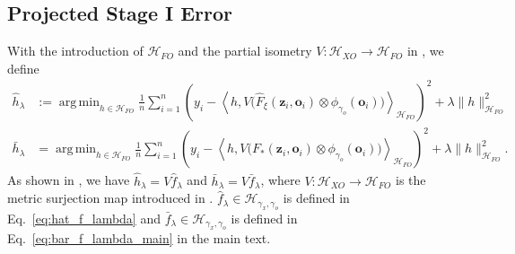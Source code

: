 \documentclass[11pt]{article}
\newcommand{\bz}{\mathbf z}
\newcommand{\bo}{\mathbf o}
\newcommand{\calH}{\mathcal{H}}
\newcommand{\0}{\mathbf{0}}
\DeclareMathOperator*{\argmin}{arg\,min}
\begin{document}
\begin{appendix}
\subsection{Projected Stage I Error}\label{sec:proj_stage_one_error}
With the introduction of $\calH_{FO}$ and the partial isometry $V:\calH_{XO}\to \calH_{FO}$ in , we define
\begin{align*}
    \hat{h}_{\lambda} &:= \argmin_{h\in \calH_{FO}}  \frac{1}{n}\sum_{i=1}^{n}  \left(y_i - \left\langle h, V\Big(\hat{F}_\xi (\bz_i, \bo_i)\otimes \phi_{\gamma_o}(\bo_i) \Big) \right\rangle_{ \calH_{FO}} \right) ^2 + \lambda \|h\|_{\calH_{FO}}^2 \\
    \bar{h}_{\lambda} &= \argmin_{h \in \calH_{FO}}  \frac{1}{n}\sum_{i=1}^{n}  \left(y_i - \left\langle h, V \Big( F_\ast(\bz_i, \bo_i) \otimes \phi_{\gamma_o}(\bo_i) \Big) \right\rangle_{ \calH_{FO}} \right) ^2 + \lambda \|h\|_{\calH_{FO}}^2 .
\end{align*}
As shown in , we have $\hat{h}_{\lambda} = V\hat{f}_{\lambda}$ and $\bar{h}_{\lambda} = V\bar{f}_{\lambda}$, where $V: \calH_{XO}\to \calH_{FO}$ is the metric surjection map introduced in .  $\hat{f}_{\lambda} \in \calH_{\gamma_x,\gamma_o}$ is defined in Eq.~\eqref{eq:hat_f_lambda} and $\bar{f}_{\lambda} \in \calH_{\gamma_x,\gamma_o}$ is defined in Eq.~\eqref{eq:bar_f_lambda_main} in the main text.


\end{appendix}
\end{document}
